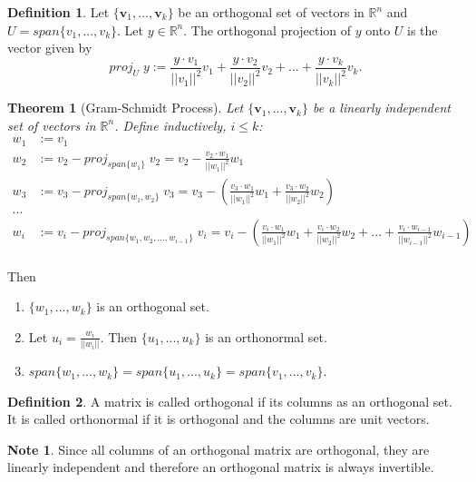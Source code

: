 \documentclass[11pt,a4paper]{article}
\newcommand\R{\mathbb{R}}
\newcommand\vb{\mathbf{v}}
\newtheorem{theorem}{Theorem}
\theoremstyle{definition}
\newtheorem{definition}{Definition}
\newtheorem{note}{Note}
\begin{document}
\begin{definition}
    Let $ \{\vb_1,...,\vb_k\} $ be an orthogonal set of vectors in $ \R^n $ and $ U = span\{v_1,...,v_k\}.$ Let $ y \in \R^n $. The orthogonal projection of $ y $ onto $ U $
    is the vector given by
    \[ proj_U \; y := \frac{y \cdot v_1}{||v_1||^2}v_1 + \frac{y \cdot v_2}{||v_2||^2}v_2 +...+ \frac{y \cdot v_k}{||v_k||^2}v_k.\]  
\end{definition}

\begin{theorem}[Gram-Schmidt Process] 
    Let  $ \{\vb_1,...,\vb_k\} $ be a linearly independent set of vectors in $ \R^n $. Define inductively, $ i \leq k $:
    \begin{align}
        w_1 &:= v_1 \\
        w_2 &:= v_2 - proj_{span\{w_1\}} \; v_2 = v_2 - \frac{v_2 \cdot w_1}{||w_1||^2}w_1\\ 
        w_3 &:= v_3 - proj_{span\{w_1, w_2\}} \; v_3 = v_3 - \left(\frac{v_3 \cdot w_1}{||w_1||^2}w_1 + \frac{v_3 \cdot w_2}{||w_2||^2}w_2 \right)\\
        ... \\
        w_i &:= v_i - proj_{span\{w_1, w_2,..., w_{i -1}\}} \; v_i = v_i - \left(\frac{v_i \cdot w_1}{||w_1||^2}w_1 + \frac{v_i \cdot w_2}{||w_2||^2}w_2 + ... +\frac{v_i \cdot w_{i - 1}}{||w_{i - 1}||^2}w_{i - 1} \right)\\
    \end{align}
\end{theorem}
Then
\begin{enumerate}
    \item $ \{w_1,...,w_k\} $ is an orthogonal set.
    \item Let $ u_i = \frac{w_i}{||w_i||} $. Then $ \{u_1,...,u_k\} $ is an orthonormal set.
    \item $ span \{w_1,...,w_k\} = span \{u_1,...,u_k\} = span\{v_1,...,v_k\} $.
\end{enumerate}

\begin{definition}
    A matrix is called orthogonal if its columns as an orthogonal set. It is called orthonormal if it is orthogonal and the columns are unit vectors.
\end{definition}

\begin{note} 
    Since all columns of an orthogonal matrix are orthogonal, they are linearly independent and therefore an orthogonal matrix is always invertible.
\end{note}
\end{document}
